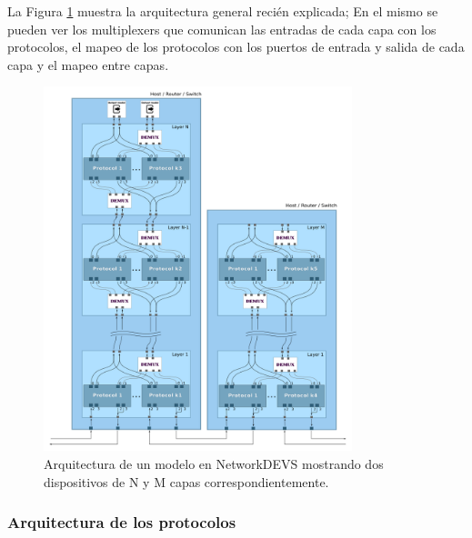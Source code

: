 \documentclass[10pt,a4paper]{article}
\begin{document}
La Figura \ref{figure:general architecture} muestra la arquitectura general recién explicada; En el mismo se pueden ver los multiplexers que comunican las entradas de cada capa con los protocolos, el mapeo de los protocolos con los puertos de entrada y salida de cada capa y el mapeo entre capas. \\

\begin{figure}[!bht]
    \centering
    \includegraphics[width = 0.8\textwidth]{img/png/general_architecture.png}
    \caption{Arquitectura de un modelo en NetworkDEVS mostrando dos dispositivos de N y M capas correspondientemente.}
    \label{figure:general architecture}
\end{figure}

\newpage

\subsubsection{Arquitectura de los protocolos}
\end{document}
